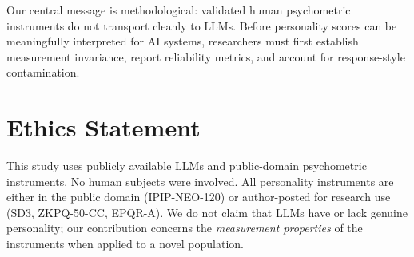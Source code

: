 \documentclass[11pt]{article}
\begin{document}
Our central message is methodological: validated human psychometric instruments do not transport cleanly to LLMs. Before personality scores can be meaningfully interpreted for AI systems, researchers must first establish measurement invariance, report reliability metrics, and account for response-style contamination.

\section*{Ethics Statement}

This study uses publicly available LLMs and public-domain psychometric instruments. No human subjects were involved. All personality instruments are either in the public domain (IPIP-NEO-120) or author-posted for research use (SD3, ZKPQ-50-CC, EPQR-A). We do not claim that LLMs have or lack genuine personality; our contribution concerns the \emph{measurement properties} of the instruments when applied to a novel population.

\clearpage



\end{document}
